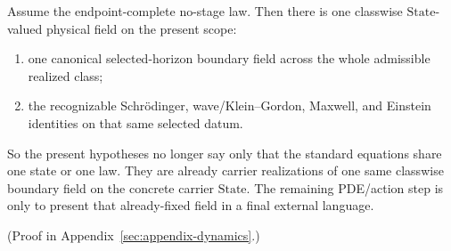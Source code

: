 \begin{corollary}
\label{cor:endpoint-complete-no-stage-law-already-yields-one-physical-field}
Assume the endpoint-complete no-stage law. Then there is one
classwise \(\mathrm{State}\)-valued physical field on the present scope:
\begin{enumerate}[label=(\roman*), leftmargin=2em, itemsep=0.2em]
\item one canonical selected-horizon boundary field across the whole
      admissible realized class;
\item the recognizable Schr\"odinger, wave/Klein--Gordon, Maxwell, and
      Einstein identities on that same selected datum.
\end{enumerate}
So the present hypotheses no longer say only that the standard equations
share one state or one law. They are already carrier realizations of one same
classwise boundary field on the concrete carrier \(\mathrm{State}\). The
remaining PDE/action step is only to present that already-fixed field in a
final external language.
\end{corollary}

(Proof in Appendix~\ref{sec:appendix-dynamics}.)

